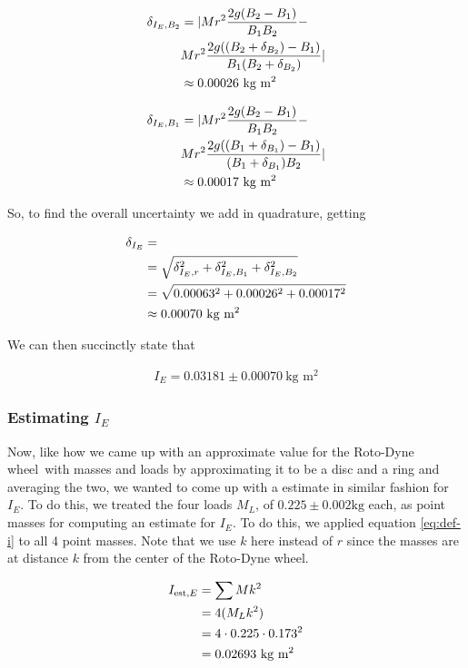 \documentclass[coverpage]{article}
\newcommand{\iUnit}{\text{kg $\text{m}^2$}}
\newcommand{\rwheel}{Roto-Dyne wheel}
\begin{document}
	\begin{align}
		\delta_{I_E, B_2} &= |M r^2 \frac{2g(B_2 - B_1)}{B_1 B_2} - \notag \\
		&M r^2 \frac{2g((B_2 + \delta_{B_2}) - B_1)}{B_1 (B_2 + \delta_{B_2})}| \notag \\
		&\approx 0.00026\ \iUnit
	\end{align}

	\begin{align}
		\delta_{I_E, B_1} &= |M r^2 \frac{2g(B_2 - B_1)}{B_1 B_2} - \notag \\
		&M r^2 \frac{2g((B_1 + \delta_{B_1}) - B_1)}{(B_1 + \delta_{B_1}) B_2}| \notag \\
		&\approx 0.00017\ \iUnit
	\end{align}

	So, to find the overall uncertainty we add in quadrature, getting
	
	\begin{align}
		\delta_{I_E} &= \\
		&= \sqrt{\delta_{I_E, r}^2 + \delta_{I_E, B_1}^2 + \delta_{I_E, B_2}^2} \notag \\
		&= \sqrt{0.00063^2 + 0.00026^2 + 0.00017^2} \notag \\
		&\approx 0.00070\ \iUnit
	\end{align}

	We can then succinctly state that
	
	\begin{align}
		I_E = 0.03181 \pm 0.00070\ \iUnit \label{eq:def-ie}
	\end{align}

	\subsubsection{Estimating $I_E$}
	
	Now, like how we came up with an approximate value for the \rwheel~with masses and loads by approximating it to be a disc and a ring and averaging the two, we wanted to come up with a estimate in similar fashion for $I_E$. To do this, we treated the four loads $M_L$, of $0.225 \pm 0.002 \text{kg}$ each, as point masses for computing an estimate for $I_E$. To do this, we applied equation \ref{eq:def-i} to all 4 point masses. Note that we use $k$ here instead of $r$ since the masses are at distance $k$ from the center of the \rwheel.
	
	\begin{align}
		I_{\text{est}, E} &= \sum{M k^2} \notag \\
		&= 4 (M_L k^2) \notag \\
		&= 4 \cdot 0.225 \cdot 0.173^2 \notag \\
		&= 0.02693\ \iUnit
	\end{align}
	
\end{document}
